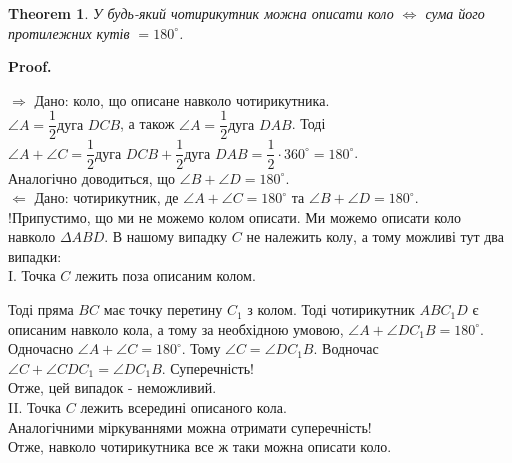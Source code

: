 \documentclass[a4paper, 10pt]{article}
\makeatletter
\def\rightproof{$\boxed{\Rightarrow}$ }
\def\leftproof{$\boxed{\Leftarrow}$ }
\def\qed{$\blacksquare$}
\theoremstyle{theoremdd}
\newtheorem{theorem}{Theorem}[subsection]
\theoremstyle{theoremdd}
\theoremstyle{theoremdd}
\theoremstyle{theoremdd}
\theoremstyle{theoremdd}
\theoremstyle{theoremdd}
\theoremstyle{theoremdd}
\theoremstyle{theoremdd}
\theoremstyle{theoremdd}
\renewenvironment{proof}[1][Proof.\\]{\par
\pushQED{\hfill \qed}%
\normalfont \topsep6\p@\@plus6\p@\relax
\trivlist
\item\relax
{\bfseries
#1\@addpunct{.}}\hspace\labelsep\ignorespaces
}{%
\popQED\endtrivlist\@endpefalse
}
\makeatother
\begin{document}
\begin{theorem}
У будь-який чотирикутник можна описати коло $\iff$ сума його протилежних кутів $= 180^\circ$.
\end{theorem}

\begin{proof}
\rightproof Дано: коло, що описане навколо чотирикутника.\\
$\angle A = \dfrac{1}{2} \text{дуга } DCB$, а також $\angle A = \dfrac{1}{2} \text{дуга } DAB$. Тоді\\
$\angle A + \angle C = \dfrac{1}{2} \text{дуга } DCB + \dfrac{1}{2} \text{дуга } DAB = \dfrac{1}{2} \cdot 360^\circ = 180^\circ$.\\
Аналогічно доводиться, що $\angle B + \angle D = 180^\circ$.
\bigskip \\
\leftproof Дано: чотирикутник, де $\angle A + \angle C = 180^\circ$ та $\angle B + \angle D = 180^\circ$.\\
!Припустимо, що ми не можемо колом описати. Ми можемо описати коло навколо $\Delta ABD$. В нашому випадку $C$ не належить колу, а тому можливі тут два випадки:\\
I. Точка $C$ лежить поза описаним колом.
\begin{figure}[H]
\centering
{}
\end{figure}
Тоді пряма $BC$ має точку перетину $C_1$ з колом. Тоді чотирикутник $ABC_1D$ є описаним навколо кола, а тому за необхідною умовою, $\angle A + \angle DC_1B = 180^\circ$. Одночасно $\angle A + \angle C = 180^\circ$. Тому $\angle C = \angle DC_1B$. Водночас $\angle C + \angle CDC_1 = \angle DC_1B$. Суперечність!\\
Отже, цей випадок - неможливий.\\
II. Точка $C$ лежить всередині описаного кола.\\
Аналогічними міркуваннями можна отримати суперечність!\\
Отже, навколо чотирикутника все ж таки можна описати коло.
\end{proof}
\end{document}
